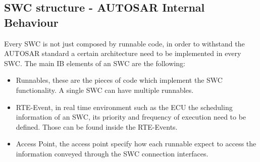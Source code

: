 \documentclass[../main.tex]{subfiles}
\begin{document}
\subsection{SWC structure - AUTOSAR Internal Behaviour}
Every \gls{SWC} is not just composed by runnable code, in order to withstand the \gls{AUTOSAR} standard a certain architecture need to be implemented in every \gls{SWC}. The main \gls{IB} elements of an SWC are the following:
\begin{itemize}
    \item Runnables, these are the pieces of code which implement the \gls{SWC} functionality. A single \gls{SWC} can have multiple runnables. 
    \item RTE-Event, in real time environment such as the \gls{ECU} the scheduling information of an SWC, its priority and frequency of execution need to be defined. Those can be found inside the RTE-Events. 
    \item Access Point, the access point specify how each runnable expect to access the information conveyed through the \gls{SWC} connection interfaces. 
\end{itemize}
\end{document}
